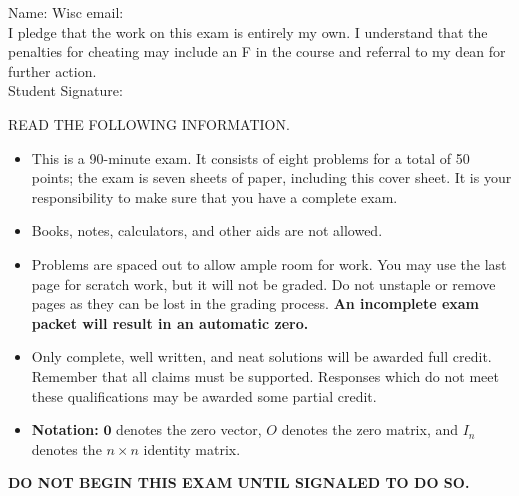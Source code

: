 \documentclass[12pt]{extarticle}
\begin{document}
\begin{framed}
\vspace*{.2in}
Name:   Wisc email:  \vspace*{.2in} \\
I pledge that the work on this exam is entirely my own. I understand that the penalties for cheating may include an F in the course and referral to my dean for further action.
 \vspace*{.3in} \\
Student Signature: 
\end{framed}
READ THE FOLLOWING INFORMATION.
\begin{itemize}
    \item This is a 90-minute exam. It consists of eight problems for a total of 50 points; the exam is seven sheets of paper, including this cover sheet. It is your responsibility to make sure that you have a complete exam.

    \item Books, notes, calculators, and other aids are not allowed.
    \item Problems are spaced out to allow ample room for work. You may use the last page for scratch work, but it will not be graded. Do not unstaple or remove pages as they can be lost in the grading process.  \textbf{An incomplete exam packet will result in an automatic zero.}  
    \item Only complete, well written, and neat solutions will be awarded full credit. Remember that all claims must be supported. Responses which do not meet these qualifications may be awarded some partial credit.
  \item \textbf{Notation:} $\mathbf{0}$ denotes the zero vector, $O$ denotes the zero matrix, and $I_n$ denotes the $n\times n$ identity matrix.
\end{itemize}

\bigskip

\textbf{DO NOT BEGIN THIS EXAM UNTIL SIGNALED TO DO SO.}



\newpage
\end{document}
